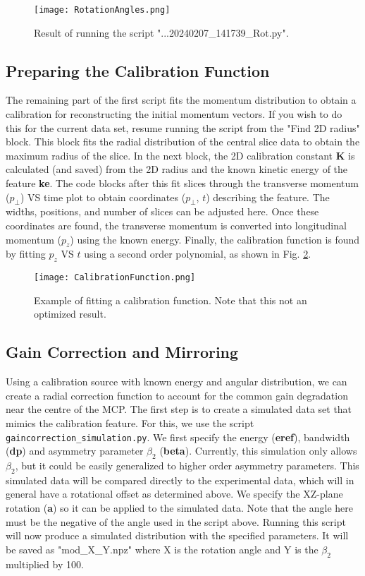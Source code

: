 \documentclass[12pt]{article}
\begin{document}
\begin{figure}
\centering
\texttt{[image: RotationAngles.png]}
\caption{
Result of running the script "...20240207\_141739\_Rot.py".
}\label{fig:RotationAngles}
\end{figure}

\subsection{Preparing the Calibration Function}

The remaining part of the first script fits the momentum distribution to obtain a calibration for reconstructing the initial momentum vectors.
If you wish to do this for the current data set, resume running the script from the "Find 2D radius" block.
This block fits the radial distribution of the central slice data to obtain the maximum radius of the slice.
In the next block, the 2D calibration constant \textbf{K} is calculated (and saved) from the 2D radius and the known kinetic energy of the feature \textbf{ke}. 
The code blocks after this fit slices through the transverse momentum ($p_\perp$) VS time plot to obtain coordinates ($p_\perp$, $t$) describing the feature.
The widths, positions, and number of slices can be adjusted here.
Once these coordinates are found, the transverse momentum is converted into longitudinal momentum ($p_z$) using the known energy.
Finally, the calibration function is found by fitting $p_z$ VS $t$ using a second order polynomial, as shown in Fig. \ref{fig:CalibrationFunction}.

\begin{figure}
\centering
\texttt{[image: CalibrationFunction.png]}
\caption{
Example of fitting a calibration function. Note that this not an optimized result.
}\label{fig:CalibrationFunction}
\end{figure}

\subsection{Gain Correction and Mirroring}

Using a calibration source with known energy and angular distribution, we can create a radial correction function to account for the common gain degradation near the centre of the MCP.
The first step is to create a simulated data set that mimics the calibration feature.
For this, we use the script \texttt{gaincorrection\_simulation.py}.
We first specify the energy (\textbf{eref}), bandwidth (\textbf{dp}) and asymmetry parameter $\beta_2$ (\textbf{beta}).
Currently, this simulation only allows $\beta_2$, but it could be easily generalized to higher order asymmetry parameters.
This simulated data will be compared directly to the experimental data, which will in general have a rotational offset as determined above.
We specify the XZ-plane rotation (\textbf{a}) so it can be applied to the simulated data. 
Note that the angle here must be the negative of the angle used in the script above.
Running this script will now produce a simulated distribution with the specified parameters.
It will be saved as "mod\_X\_Y.npz" where X is the rotation angle and Y is the $\beta_2$ multiplied by 100.
\end{document}
